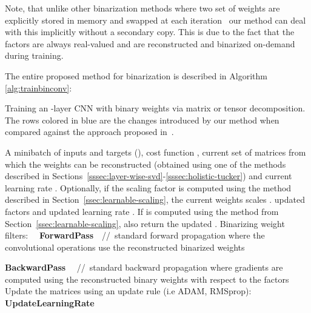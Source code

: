 \documentclass[10pt,twocolumn,letterpaper]{article}
\begin{document}
Note, that unlike other binarization methods where two set of weights are explicitly stored in memory and swapped at each iteration~\cite{rastegari2016xnor} our method can deal with this implicitly without a secondary copy. This is due to the fact that the factors are always real-valued and are reconstructed and binarized on-demand during training.

The entire proposed method for binarization is described in Algorithm \ref{alg:trainbinconv}:

\renewcommand{\algorithmicrequire}{\textbf{Input:}}
\renewcommand{\algorithmicensure}{\textbf{Output:}}
\begin{algorithm}[thb]	
{
  \caption{Training an -layer CNN with binary weights via matrix or tensor decomposition. The rows colored in {\color{blue} blue} are the changes introduced by our method when compared against the approach proposed in~\cite{rastegari2016xnor}.}
  \label{alg:trainbinconv}       
  \begin{algorithmic}[1]
      \REQUIRE A minibatch of inputs and targets  (), cost function , current set of matrices from which the weights can be reconstructed   (obtained using one of the methods described in Sections~\ref{sssec:layer-wise-svd}-\ref{sssec:holistic-tucker}) and current learning rate .  Optionally, if the scaling factor is computed using the method described in Section~\ref{ssec:learnable-scaling}, the current weights scales .
  \ENSURE updated factors  and updated learning rate .  If  is computed using the method from Section~\ref{ssec:learnable-scaling}, also return the updated .
  \STATE Binarizing weight filters:
          \STATE { \color{blue} }
      \ELSE
              \STATE 
              \STATE 
              \STATE 
          \ENDFOR
      \ENDIF
   \ENDFOR
  \STATE  ~~\textbf{ForwardPass}~~//~{\scriptsize standard forward propagation where the convolutional operations use the reconstructed binarized weights }
  
  \STATE  \textbf{BackwardPass} ~~//~{\scriptsize standard backward propagation where gradients are computed using the reconstructed binary weights with respect to the factors}
  \STATE Update the matrices using an update rule (i.e ADAM, RMSprop):
  {\color{blue} 
  \ENDFOR
  }
  {\color{blue} 
  \ENDIF
  }
 \STATE  \textbf{UpdateLearningRate}
  \end{algorithmic}
  } \normalsize
\end{algorithm}
\end{document}
